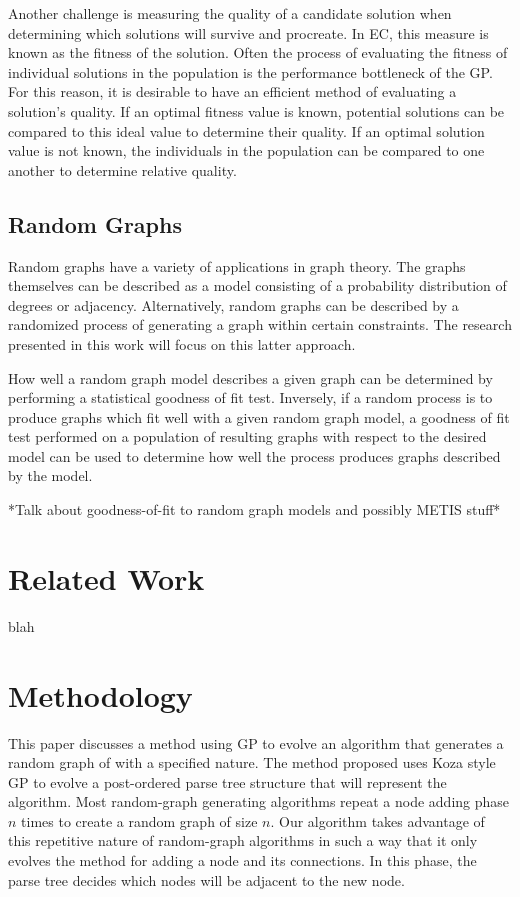 \documentclass{article}
\begin{document}
Another challenge is measuring the quality of a candidate solution when determining which solutions will survive and procreate. In EC, this measure is known as the fitness of the solution. Often the process of evaluating the fitness of individual solutions in the population is the performance bottleneck of the GP. For this reason, it is desirable to have an efficient method of evaluating a solution's quality. If an optimal fitness value is known, potential solutions can be compared to this ideal value to determine their quality. If an optimal solution value is not known, the individuals in the population can be compared to one another to determine relative quality.

\subsection{Random Graphs}

Random graphs have a variety of applications in graph theory. The graphs themselves can be described as a model consisting of a probability distribution of degrees or adjacency. Alternatively, random graphs can be described by a randomized process of generating a graph within certain constraints. The research presented in this work will focus on this latter approach.

How well a random graph model describes a given graph can be determined by performing a statistical goodness of fit test. Inversely, if a random process is to produce graphs which fit well with a given random graph model, a goodness of fit test performed on a population of resulting graphs with respect to the desired model can be used to determine how well the process produces graphs described by the model. 

 *Talk about goodness-of-fit to random graph models and possibly METIS stuff*

\section{Related Work}
blah

\section{Methodology}

This paper discusses a method using GP to evolve an algorithm that generates a random graph of with a specified nature.  The method proposed uses Koza style GP to evolve a post-ordered parse tree structure that will represent the algorithm. Most random-graph generating algorithms repeat a node adding phase $n$ times to create a random graph of size $n$. Our algorithm takes advantage of this repetitive nature of random-graph algorithms in such a way that it only evolves the method for adding a node and its connections. In this phase, the parse tree decides which nodes will be adjacent to the new node.
\end{document}
